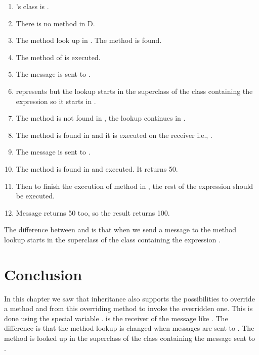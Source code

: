 \documentclass[10pt,twoside,english]{_support/latex/sbabook/sbabook}
\begin{document}
\begin{enumerate}
\item {}'s class is .
\item There is no method  in D.
\item The method look up in . The method  is found.
\item The method  of  is executed.
\item The message  is sent to .
\item {} represents  but the lookup starts in the superclass of the class containing the expression  so it starts in .
\item The method  is not found in , the lookup continues in .
\item The method  is found in  and it is executed on the receiver i.e., .
\item The message  is sent to .
\item The method  is found in  and executed. It returns 50. 
\item Then to finish the execution of method  in , the rest of the expression  should be executed.
\item Message  returns 50 too, so the result returns 100. 
\end{enumerate}

\begin{important}
The difference between  and  is that when we send a message to  the method lookup starts in the superclass of the class containing the expression .
\end{important}
\section{Conclusion}
In this chapter we saw that inheritance also supports the possibilities to override a method and from this overriding method to invoke the overridden one. This is done using the special variable . 
 is the receiver of the message like . The difference is that the method lookup is changed when messages are sent to . The method is looked up in the superclass of the class containing the message sent to . 
\end{document}
